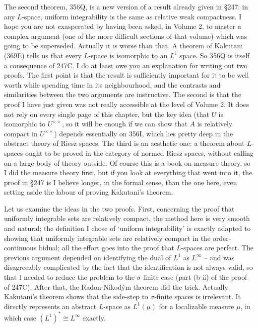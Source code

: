 {The second theorem, 356Q, is a new version of a result already given in
\S247:  in any $L$-space, uniform integrability is the same as relative
weak compactness.   I hope you are not exasperated by having been asked,
in Volume 2, to master a complex argument (one of the more difficult
sections of that volume) which was going to be superseded.   Actually it
is worse than that.   A theorem of Kakutani (369E) tells us that
every $L$-space is isomorphic to an $L^1$ space.   So 356Q is itself a
consequence of 247C.   I do at least owe you an explanation for writing
out two proofs.   The first point is that the result is sufficiently
important for it to be well worth while spending time in its
neighbourhood, and the contrasts and similarities between the two
arguments are instructive.   The second is that the proof I have just
given was not really accessible at the level of Volume 2.   It does not
rely on every single page of this chapter, but the key idea (that $U$ is
isomorphic to $U^{\times\times}$, so it will be enough if we can show
that $A$ is relatively compact in $U^{\times\times}$) depends
essentially on 356I, which lies pretty deep in the abstract theory of
Riesz spaces.   The third is an aesthetic one:  a theorem about
$L$-spaces ought to be proved in the category of normed Riesz spaces,
without calling on a large body of theory outside.   Of course this is a
book on measure theory, so I did the measure theory first, but if you
look at everything that went into it, the proof in \S247 is I believe
longer, in the formal sense, than the one here, even setting aside the
labour of proving Kakutani's theorem.

Let us examine the ideas in the two proofs.   First, concerning the
proof that uniformly integrable sets are relatively compact, the method
here is very smooth and natural;  the definition I chose of `uniform
integrability' is exactly adapted to showing that uniformly integrable
sets are relatively compact in the order-continuous bidual;  all the
effort goes into the proof that $L$-spaces are perfect.   The previous
argument depended on identifying the dual of $L^1$ as $L^{\infty}$ --
and was disagreeably complicated by the fact that the identification is
not always valid, so that I needed to reduce the problem to the
$\sigma$-finite case (part (b-ii) of the proof of 247C).   After that,
the Radon-Nikod\'ym theorem did the trick.   Actually Kakutani's theorem
shows that the side-step to $\sigma$-finite spaces is irrelevant.   It
directly represents an abstract $L$-space as $L^1(\mu)$ for a
localizable measure $\mu$, in which case $(L^1)^*\cong L^{\infty}$
exactly.

}

